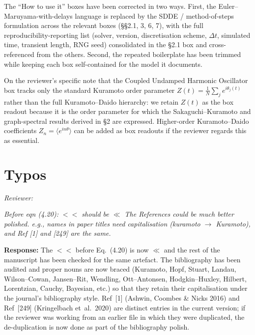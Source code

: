 \documentclass[12pt,a4paper]{article}
\newcommand{\reviewercomment}[1]{\par\smallskip\noindent\textit{Reviewer:}\par\smallskip\begingroup\itshape #1\par\endgroup\smallskip}
\newcommand{\ourresponse}[1]{\par\noindent\textbf{Response:} #1\par\medskip}
\begin{document}
{The ``How to use it'' boxes have been corrected in two ways. First, the Euler--Maruyama-with-delays language is replaced by the SDDE / method-of-steps formulation across the relevant boxes (§§2.1, 3, 6, 7), with the full reproducibility-reporting list (solver, version, discretisation scheme, $\Delta t$, simulated time, transient length, RNG seed) consolidated in the §2.1 box and cross-referenced from the others. Second, the repeated boilerplate has been trimmed while keeping each box self-contained for the model it documents.

On the reviewer's specific note that the Coupled Undamped Harmonic Oscillator box tracks only the standard Kuramoto order parameter $Z(t)=\tfrac{1}{N}\sum_j e^{i\theta_j(t)}$ rather than the full Kuramoto--Daido hierarchy: we retain $Z(t)$ as the box readout because it is the order parameter for which the Sakaguchi--Kuramoto and graph-spectral results derived in §2 are expressed. Higher-order Kuramoto--Daido coefficients $Z_n=\langle e^{i n\theta}\rangle$ can be added as box readouts if the reviewer regards this as essential.}

\section*{Typos}

\reviewercomment{Before eqn (4.20): $<\!<$ should be $\ll$ The References could be much better polished. e.g., names in paper titles need capitalisation (kuramoto $\to$ Kuramoto), and Ref [1] and [249] are the same.}

\ourresponse{The $<\!<$ before Eq.~(4.20) is now $\ll$ and the rest of the manuscript has been checked for the same artefact. The bibliography has been audited and proper nouns are now braced (Kuramoto, Hopf, Stuart, Landau, Wilson--Cowan, Jansen--Rit, Wendling, Ott--Antonsen, Hodgkin--Huxley, Hilbert, Lorentzian, Cauchy, Bayesian, etc.) so that they retain their capitalisation under the journal's bibliography style. Ref~[1] (Ashwin, Coombes \& Nicks 2016) and Ref~[249] (Kringelbach et~al.~2020) are distinct entries in the current version; if the reviewer was working from an earlier file in which they were duplicated, the de-duplication is now done as part of the bibliography polish.}
\end{document}
